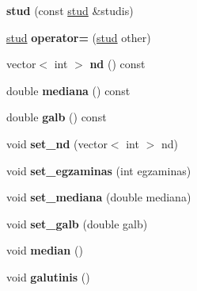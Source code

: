\begin{DoxyCompactItemize}
\item 
\mbox{\label{classstud_a4611192e9f1e1c0e00c6727055111136}} 
{\bfseries stud} (const \mbox{\hyperlink{classstud}{stud}} \&studis)
\item 
\mbox{\label{classstud_a743e7512461a8911ebc34fd8a94e7b7b}} 
\mbox{\hyperlink{classstud}{stud}} {\bfseries operator=} (\mbox{\hyperlink{classstud}{stud}} other)
\item 
\mbox{\label{classstud_aa184a8b2ec3029d7570fa7134ac6a865}} 
vector$<$ int $>$ {\bfseries nd} () const
\item 
\mbox{\label{classstud_a1ab10468a2cd054e053decd7c38f75c6}} 
double {\bfseries mediana} () const
\item 
\mbox{\label{classstud_a01b7e3cdb25f6ddf349112a82ead1bed}} 
double {\bfseries galb} () const
\item 
\mbox{\label{classstud_a223829b3c1d302d064887039a2eac561}} 
void {\bfseries set\+\_\+nd} (vector$<$ int $>$ nd)
\item 
\mbox{\label{classstud_a683010558db24bbf0d538c4571c503cd}} 
void {\bfseries set\+\_\+egzaminas} (int egzaminas)
\item 
\mbox{\label{classstud_a243eb59c26cbddece0dbfa05f3f5cc8a}} 
void {\bfseries set\+\_\+mediana} (double mediana)
\item 
\mbox{\label{classstud_a2d4e10fdb89ae381e88d01c28d4c8b06}} 
void {\bfseries set\+\_\+galb} (double galb)
\item 
\mbox{\label{classstud_a33435d8e75c0271e27954d4886582617}} 
void {\bfseries median} ()
\item 
\mbox{\label{classstud_a1a3c387ea37ed03bb21b3f798d3d03ab}} 
void {\bfseries galutinis} ()
\end{DoxyCompactItemize}
